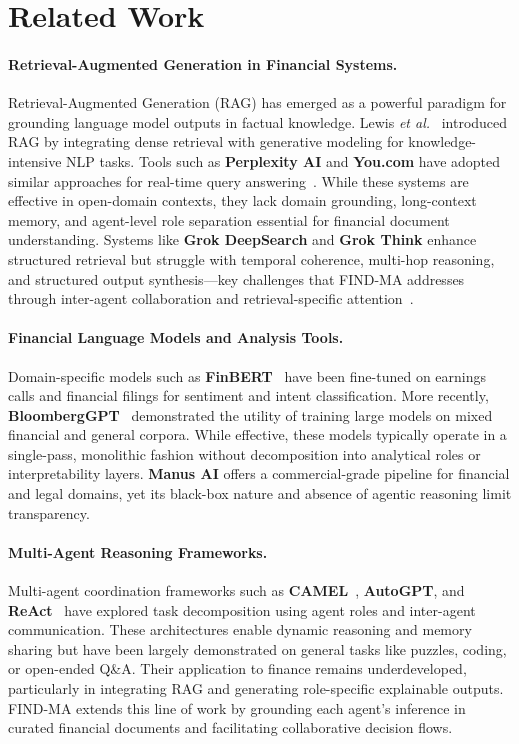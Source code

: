\documentclass[11pt]{article}
\newcommand{\findma}{\textsc{FIND-MA}}
\newcommand{\etal}{\textit{et al.}}
\begin{document}
\section{Related Work}
\label{sec:related}

\paragraph{Retrieval-Augmented Generation in Financial Systems.}
Retrieval-Augmented Generation (RAG) has emerged as a powerful paradigm for grounding language model outputs in factual knowledge. Lewis \etal~\cite{lewis2020retrieval} introduced RAG by integrating dense retrieval with generative modeling for knowledge-intensive NLP tasks. Tools such as \textbf{Perplexity AI} and \textbf{You.com} have adopted similar approaches for real-time query answering~\citep{lewis2020retrieval}. While these systems are effective in open-domain contexts, they lack domain grounding, long-context memory, and agent-level role separation essential for financial document understanding. Systems like \textbf{Grok DeepSearch} and \textbf{Grok Think} enhance structured retrieval but struggle with temporal coherence, multi-hop reasoning, and structured output synthesis—key challenges that \findma{} addresses through inter-agent collaboration and retrieval-specific attention~\citep{wu2023autogen}.

\paragraph{Financial Language Models and Analysis Tools.}
Domain-specific models such as \textbf{FinBERT}~\cite{araci2019finbert} have been fine-tuned on earnings calls and financial filings for sentiment and intent classification. More recently, \textbf{BloombergGPT}~\cite{wu2023bloomberggpt} demonstrated the utility of training large models on mixed financial and general corpora. While effective, these models typically operate in a single-pass, monolithic fashion without decomposition into analytical roles or interpretability layers. \textbf{Manus AI} offers a commercial-grade pipeline for financial and legal domains, yet its black-box nature and absence of agentic reasoning limit transparency.

\paragraph{Multi-Agent Reasoning Frameworks.}
Multi-agent coordination frameworks such as \textbf{CAMEL}~\cite{li2023camel}, \textbf{AutoGPT}, and \textbf{ReAct}~\cite{yao2023react} have explored task decomposition using agent roles and inter-agent communication. These architectures enable dynamic reasoning and memory sharing but have been largely demonstrated on general tasks like puzzles, coding, or open-ended Q\&A. Their application to finance remains underdeveloped, particularly in integrating RAG and generating role-specific explainable outputs. \findma{} extends this line of work by grounding each agent’s inference in curated financial documents and facilitating collaborative decision flows.
\end{document}
